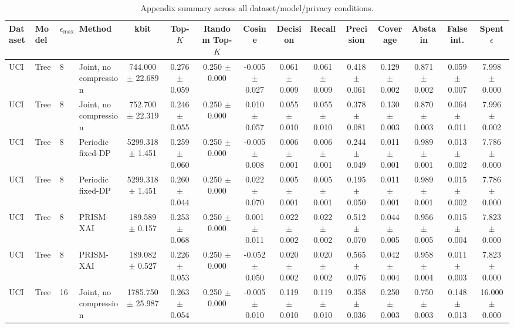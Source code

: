 \begin{table}[t]
\caption{Appendix summary across all dataset/model/privacy conditions.}
\label{tab:appendix-conditions}
\centering
\scriptsize
\setlength{\tabcolsep}{2.5pt}
\begin{tabular}{llllccccccccccc}
\toprule
Dataset & Model & $\epsilon_{\max}$ & Method & kbit & Top-$K$ & Random Top-$K$ & Cosine & Decision & Recall & Precision & Coverage & Abstain & False int. & Spent $\epsilon$ \\
\midrule
UCI & Tree & 8 & Joint, no compression & 744.000 $\pm$ 22.689 & 0.276 $\pm$ 0.059 & 0.250 $\pm$ 0.000 & -0.005 $\pm$ 0.027 & 0.061 $\pm$ 0.009 & 0.061 $\pm$ 0.009 & 0.418 $\pm$ 0.061 & 0.129 $\pm$ 0.002 & 0.871 $\pm$ 0.002 & 0.059 $\pm$ 0.007 & 7.998 $\pm$ 0.000 \\
UCI & Tree & 8 & Joint, no compression & 752.700 $\pm$ 22.319 & 0.246 $\pm$ 0.055 & 0.250 $\pm$ 0.000 & 0.010 $\pm$ 0.057 & 0.055 $\pm$ 0.010 & 0.055 $\pm$ 0.010 & 0.378 $\pm$ 0.081 & 0.130 $\pm$ 0.003 & 0.870 $\pm$ 0.003 & 0.064 $\pm$ 0.011 & 7.996 $\pm$ 0.002 \\
UCI & Tree & 8 & Periodic fixed-DP & 5299.318 $\pm$ 1.451 & 0.259 $\pm$ 0.060 & 0.250 $\pm$ 0.000 & -0.005 $\pm$ 0.008 & 0.006 $\pm$ 0.001 & 0.006 $\pm$ 0.001 & 0.244 $\pm$ 0.049 & 0.011 $\pm$ 0.001 & 0.989 $\pm$ 0.001 & 0.013 $\pm$ 0.002 & 7.786 $\pm$ 0.000 \\
UCI & Tree & 8 & Periodic fixed-DP & 5299.318 $\pm$ 1.451 & 0.260 $\pm$ 0.044 & 0.250 $\pm$ 0.000 & 0.022 $\pm$ 0.070 & 0.005 $\pm$ 0.001 & 0.005 $\pm$ 0.001 & 0.195 $\pm$ 0.050 & 0.011 $\pm$ 0.001 & 0.989 $\pm$ 0.001 & 0.015 $\pm$ 0.002 & 7.786 $\pm$ 0.000 \\
UCI & Tree & 8 & PRISM-XAI & 189.589 $\pm$ 0.157 & 0.253 $\pm$ 0.068 & 0.250 $\pm$ 0.000 & 0.001 $\pm$ 0.011 & 0.022 $\pm$ 0.002 & 0.022 $\pm$ 0.002 & 0.512 $\pm$ 0.070 & 0.044 $\pm$ 0.005 & 0.956 $\pm$ 0.005 & 0.015 $\pm$ 0.004 & 7.823 $\pm$ 0.000 \\
UCI & Tree & 8 & PRISM-XAI & 189.082 $\pm$ 0.527 & 0.226 $\pm$ 0.053 & 0.250 $\pm$ 0.000 & -0.052 $\pm$ 0.050 & 0.020 $\pm$ 0.002 & 0.020 $\pm$ 0.002 & 0.565 $\pm$ 0.076 & 0.042 $\pm$ 0.004 & 0.958 $\pm$ 0.004 & 0.011 $\pm$ 0.003 & 7.823 $\pm$ 0.000 \\
UCI & Tree & 16 & Joint, no compression & 1785.750 $\pm$ 25.987 & 0.263 $\pm$ 0.054 & 0.250 $\pm$ 0.000 & -0.005 $\pm$ 0.010 & 0.119 $\pm$ 0.010 & 0.119 $\pm$ 0.010 & 0.358 $\pm$ 0.036 & 0.250 $\pm$ 0.003 & 0.750 $\pm$ 0.003 & 0.148 $\pm$ 0.013 & 16.000 $\pm$ 0.000 \\

\end{tabular}
\end{table}
